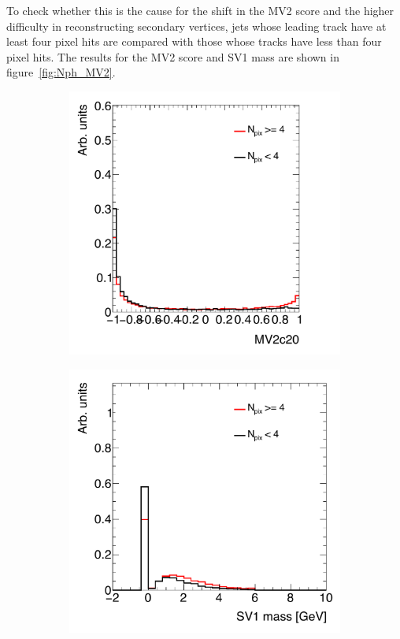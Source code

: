 To check whether this is the cause for the shift in the MV2 score and the higher difficulty in reconstructing secondary vertices, jets whose leading track have at least four pixel hits are compared with those whose tracks have less than four pixel hits. The results for the MV2 score and SV1 mass are shown in figure~\ref{fig:Nph_MV2}. 
%
\begin{figure}[h!]
  \centering
  \captionsetup{justification=centering}

   \begin{subfigure}[t]{0.5\textwidth}
        \centering
        \includegraphics[width=\textwidth]{figures/Nph_MV2c20}
        \caption{}
    \end{subfigure}%
    \begin{subfigure}[t]{0.5\textwidth}
        \centering
        \includegraphics[width=\textwidth]{figures/Nph_SV1mass}

\end{subfigure}
\end{figure}
